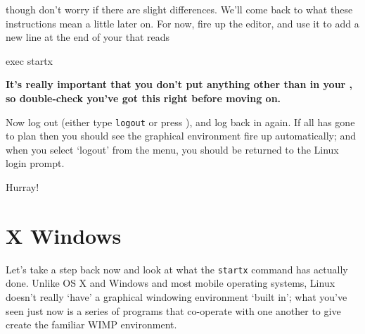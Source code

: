 though don't worry if there are slight differences. We'll come back to what these instructions mean a little later on. For now, fire up the  editor, and use it to add a new line at the end of your  that reads 

\begin{ttoutenv}
exec startx
\end{ttoutenv}

\textbf{It's really important that you don't put anything other than  in your , so double-check you've got this right before moving on.}

Now log out (either type \texttt{logout} or press ), and log back in again. If all has gone to plan then you should see the graphical environment fire up automatically; and when you select `logout' from the menu, you should be returned to the Linux login prompt. 

Hurray!

\section{X Windows}

Let's take a step back now and look at what the \texttt{startx} command has actually done. Unlike OS X and Windows and most mobile operating systems, Linux doesn't really `have' a graphical windowing environment `built in'; what you've seen just now is a series of programs that co-operate with one another to give create the familiar WIMP environment. 

